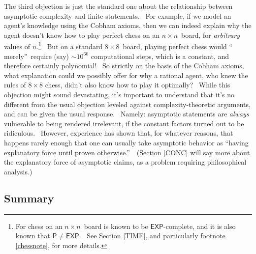 \documentclass[12pt,onecolumn]{article}%
\begin{document}
The third objection is just the standard one about the relationship between
asymptotic complexity and finite statements. \ For example, if we model an
agent's knowledge using the Cobham axioms, then we can indeed explain why the
agent doesn't know how to play perfect chess on an $n\times n$\ board, for
\textit{arbitrary} values of $n$.\footnote{For chess on an $n\times n$\ board
is known to be $\mathsf{EXP}$-complete, and it is also known that
$\mathsf{P}\neq\mathsf{EXP}$. \ See Section \ref{TIME}, and particularly
footnote \ref{chessnote}, for more details.} \ But on a standard $8\times
8$\ board, playing perfect chess would \textquotedblleft
merely\textquotedblright\ require (say) $\sim10^{60}$ computational steps,
which is a constant, and therefore certainly polynomial! \ So strictly on the
basis of the Cobham axioms, what explanation could we possibly offer for why a
rational agent, who knew the rules of $8\times8$ chess, didn't also know how
to play it optimally? \ While this objection might sound devastating, it's
important to understand that it's no different from the usual objection
leveled against complexity-theoretic arguments, and can be given the usual
response. \ Namely: asymptotic statements are \textit{always} vulnerable to
being rendered irrelevant, if the constant factors turned out to be
ridiculous. \ However, experience has shown that, for whatever reasons, that
happens rarely enough that one can usually take asymptotic behavior as
\textquotedblleft having explanatory force until proven
otherwise.\textquotedblright\ \ (Section \ref{CONC} will say more about the
explanatory force of asymptotic claims, as a problem requiring philosophical analysis.)

\subsection{Summary}
\end{document}
